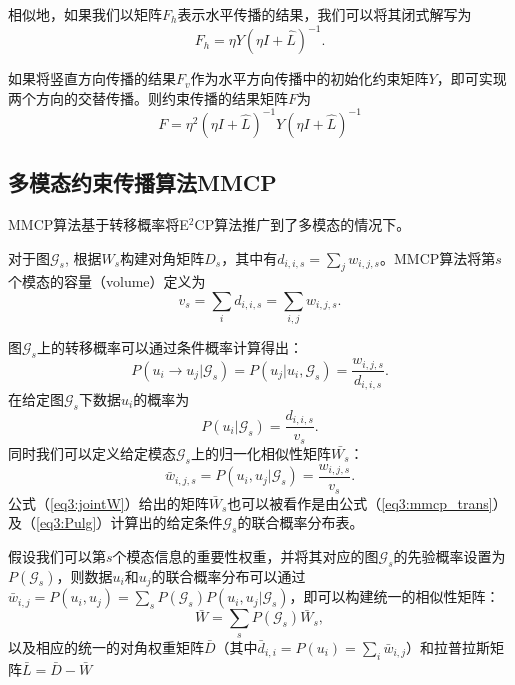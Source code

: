 相似地，如果我们以矩阵$F_h$表示水平传播的结果，我们可以将其闭式解写为
\begin{equation}
{F}_h = \eta{Y}(\eta{I}+\hat{{L}})^{-1}.
\end{equation}

如果将竖直方向传播的结果$F_v$作为水平方向传播中的初始化约束矩阵$Y$，即可实现两个方向的交替传播。则约束传播的结果矩阵$F$为
\begin{equation}
{F} = \eta^2(\eta{I}+\hat{{L}})^{-1}{Y}(\eta{I}+\hat{{L}})^{-1}
\label{eq3:e2cp}
\end{equation}

\subsection{多模态约束传播算法MMCP}
MMCP算法基于转移概率将E$^2$CP算法推广到了多模态的情况下。

对于图$\mathcal{G}_s$, 根据${W}_s$构建对角矩阵${D}_s$，其中有$d_{i,i,s} = \sum_j w_{i,j,s}$。MMCP算法将第$s$个模态的容量（volume）定义为
\begin{equation}
v_s = \sum_i d_{i,i,s} = \sum_{i,j}w_{i,j,s}.
\end{equation}

图$\mathcal{G}_s$上的转移概率可以通过条件概率计算得出：
\begin{equation}
	P(u_i\rightarrow u_j|\mathcal{G}_s) = P(u_j|u_i,\mathcal{G}_s) = \frac{w_{i,j,s}}{d_{i,i,s}}.
	\label{eq3:mmcp_trans}
\end{equation}
在给定图$\mathcal{G}_s$下数据$u_i$的概率为
\begin{equation}
P(u_i|\mathcal{G}_s) = \frac{d_{i,i,s}}{v_s}.
\label{eq3:Pulg}
\end{equation}
同时我们可以定义给定模态$\mathcal{G}_s$上的归一化相似性矩阵$\bar{W_s}$：
\begin{equation}
    \bar{w}_{i,j,s} = P(u_i, u_j|\mathcal{G}_s) = \frac{{w}_{i,j,s}}{v_s}.
    \label{eq3:jointW}
\end{equation}
公式（\ref{eq3:jointW}）给出的矩阵$\bar{W}_s$也可以被看作是由公式（\ref{eq3:mmcp_trans}）及（\ref{eq3:Pulg}）计算出的给定条件$\mathcal{G}_s$的联合概率分布表。

假设我们可以第$s$个模态信息的重要性权重，并将其对应的图$\mathcal{G}_s$的先验概率设置为$ P(\mathcal{G}_s) $，则数据$u_i$和$u_j$的联合概率分布可以通过$ \bar{w}_{i,j}= P(u_i, u_j) = \sum_s P(\mathcal{G}_s) P(u_i, u_j|\mathcal{G}_s) $，即可以构建统一的相似性矩阵：
\begin{equation}
\bar{{W}} = \sum_s P(\mathcal{G}_s)\bar{{W}}_s, 
\label{eq3:unifiedW}
\end{equation}
以及相应的统一的对角权重矩阵$ \bar{{D}}$（其中$ \bar{d}_{i,i} = P(u_i) =\sum_i \bar{w}_{i,j}$）和拉普拉斯矩阵$ \bar{{L}} = \bar{{D}}-\bar{{W}}$

